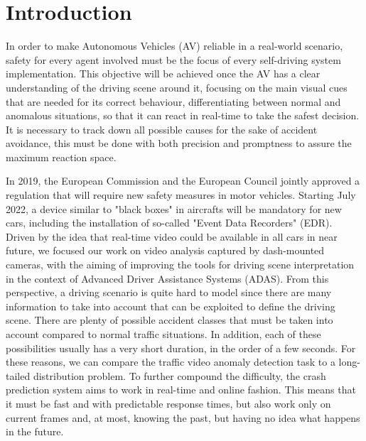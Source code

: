 \section{Introduction}

In order to make Autonomous Vehicles (AV) reliable in a real-world scenario, safety for every agent involved must be the focus of every self-driving system implementation.
This objective will be achieved once the AV has a clear understanding of the driving scene around it, focusing on the main visual cues that are needed for its correct behaviour, differentiating between normal and anomalous situations, so that it can react in real-time to take the safest decision.
It is necessary to track down all possible causes for the sake of accident avoidance, this must be done with both precision and promptness to assure the maximum reaction space.

In 2019, the European Commission and the European Council jointly approved a regulation that will require new safety measures in motor vehicles.
Starting July 2022, a device similar to "black boxes" in aircrafts will be mandatory for new cars, including the installation of so-called "Event Data Recorders" (EDR).
Driven by the idea that real-time video could be available in all cars in near future, we focused our work on video analysis captured by dash-mounted cameras, with the aiming of improving the tools for driving scene interpretation in the context of Advanced Driver Assistance Systems (ADAS).
From this perspective, a driving scenario is quite hard to model since there are many information to take into account that can be exploited to define the driving scene.
There are plenty of possible accident classes that must be taken into account compared to normal traffic situations.
In addition, each of these possibilities usually has a very short duration, in the order of a few seconds.
For these reasons, we can compare the traffic video anomaly detection task to a long-tailed distribution problem.
To further compound the difficulty, the crash prediction system aims to work in real-time and online fashion.
This means that it must be fast and with predictable response times, but also work only on current frames and, at most, knowing the past, but having no idea what happens in the future.

